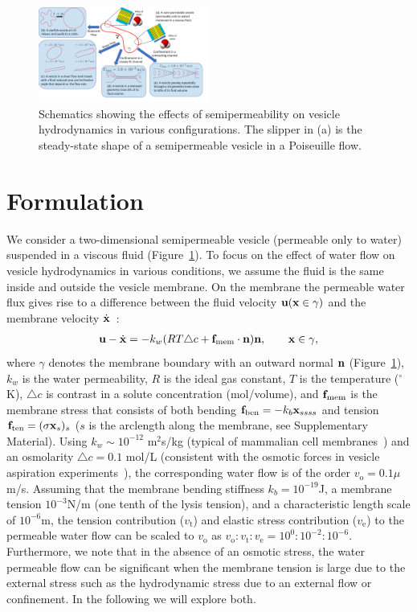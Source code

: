 \documentclass[9pt,twocolumn,twoside,lineno]{pnas-new}
\begin{document}
\begin{figure}[htp]
  \centering
  \includegraphics[width=0.5\textwidth]{figures/schematic.pdf}
  \caption{\label{fig:sketch} Schematics showing the effects of
  semipermeability on vesicle hydrodynamics in various configurations.
  The slipper in (a) is the steady-state shape of a semipermeable
  vesicle in a Poiseuille flow.}
\end{figure}

\section*{Formulation}
We consider a two-dimensional semipermeable vesicle (permeable only to
water) suspended in a viscous fluid (Figure~\ref{fig:sketch}). To focus
on the effect of water flow on vesicle hydrodynamics in various
conditions, we assume the fluid is the same inside and outside the
vesicle membrane. On the membrane the permeable water flux gives rise to
a difference between the fluid velocity ${\mathbf{u}}({\mathbf{x}}\in \gamma)$ and the
membrane velocity $\dot{\mathbf{x}}$~\cite{yao-mor2017}:
\begin{align}
  \mathbf{u} - \dot{\mathbf{x}} = - k_w (R T \triangle c + \mathbf{f}_\mathrm{mem} \cdot \mathbf{n}) \mathbf{n}, \qquad
  \mathbf{x} \in \gamma,
\end{align}
where $\gamma$ denotes the membrane boundary with an outward normal
$\mathbf{n}$ (Figure~\ref{fig:sketch}), $k_w$ is the water permeability, $R$ is
the ideal gas constant, $T$ is the temperature ($^{\circ}$K), $\triangle
c$ is contrast in a solute concentration (mol/volume), and
$\mathbf{f}_\mathrm{mem}$ is the membrane stress that consists of both bending
$ \mathbf{f}_\mathrm{ben}= -k_b \mathbf{x}_{ssss}$ and tension
$\mathbf{f}_\mathrm{ten}=(\sigma \mathbf{x}_s)_s$ ($s$ is the arclength along the
membrane, see Supplementary Material). Using $k_w\sim 10^{-12}$
m$^2$s/kg (typical of mammalian cell membranes~\cite{LiMoriSun2015_PRL})
and an osmolarity $\triangle c = 0.1$ mol/L (consistent with the osmotic
forces in vesicle aspiration
experiments~\cite{OlbrichRawiczNeedhamEtAl2000_BJ}), the corresponding
water flow is of the order $v_\mathrm{o}=0.1 \mu$m/s. Assuming that the
membrane bending stiffness $k_b = 10^{-19}$J, a membrane tension
$10^{-3}$N/m (one tenth of the lysis tension), and a characteristic
length scale of $10^{-6}$m, the tension contribution ($v_\mathrm{t}$)
and elastic stress contribution ($v_\mathrm{e}$) to the permeable water
flow can be scaled to $v_\mathrm{o}$ as
$v_\mathrm{o}:v_\mathrm{t}:v_\mathrm{e}=10^{0}:10^{-2}:10^{-6}$.
Furthermore, we note that in the absence of an osmotic stress, the water
permeable flow can be significant when the membrane tension is large due
to the external stress such as the hydrodynamic stress due to an
external flow or confinement. In the following we will explore both.
\end{document}
